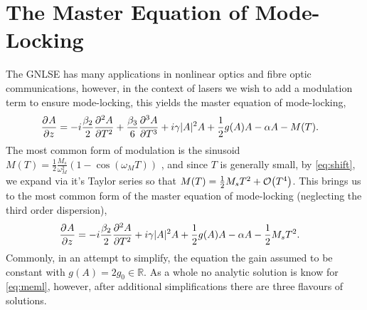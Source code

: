 \section{The Master Equation of Mode-Locking}
\label{chap:meml}
The GNLSE has many applications in nonlinear optics and fibre optic communications, however, in the context of lasers we wish to add a modulation term to ensure mode-locking, this yields the master equation of mode-locking, \cite{hausbook, haus1975, haus1986, haus1992, haus2000, kartner, tamura, usechak}
\begin{align}
\pdiff{A}{z} &= - i \frac{\beta_2}{2}\pdiff[2]{A}{T} + \frac{\beta_3}{6}\pdiff[3]{A}{T} + i \gamma |A|^2 A + \frac{1}{2}g(A) A - \alpha A - M(T).
\end{align}
The most common form of modulation is the sinusoid $M(T) = \frac{1}{2}\frac{M_s}{\omega_M^2} \left( 1 - \cos \left( \omega_M T \right) \right)$ \cite{hausbook, haus1975, haus1996, kartner}, and since $T$ is generally small, by \eqref{eq:shift}, we expand via it's Taylor series so that $M(T) = \frac{1}{2}M_s T^2 + \bigO{T^4}$. This brings us to the most common form of the master equation of mode-locking (neglecting the third order dispersion),
\begin{align}
\label{eq:meml}
\pdiff{A}{z} &= - i \frac{\beta_2}{2}\pdiff[2]{A}{T} + i \gamma |A|^2 A + \frac{1}{2}g(A) A - \alpha A - \frac{1}{2}M_s T^2.
\end{align}
Commonly, in an attempt to simplify, the equation the gain assumed to be constant with $g(A) = 2g_0 \in \mathbb{R}$. As a whole no analytic solution is know for \eqref{eq:meml}, however, after additional simplifications there are three flavours of solutions. \\

